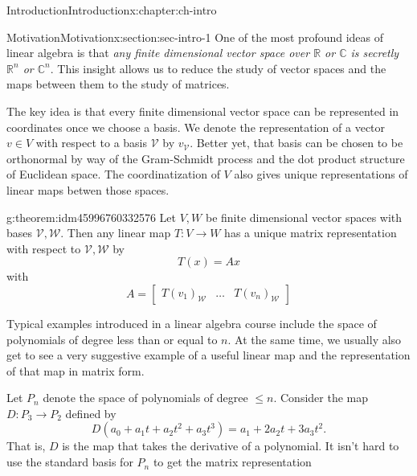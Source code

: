 \documentclass[oneside,10pt,]{book}
\numberwithin{equation}{section}
\newcommand{\C}{\mathbb{C}}
\newcommand{\R}{\mathbb{R}}
\newcommand\bbm{\begin{bmatrix}}
\newcommand\ebm{\end{bmatrix}}
\numberwithin{equation}{section}
\newcommand{\amp}{&}
\begin{document}
\begin{chapterptx}{Introduction}{}{Introduction}{}{}{x:chapter:ch-intro}
%
%
\typeout{************************************************}
\typeout{************************************************}
%
\begin{sectionptx}{Motivation}{}{Motivation}{}{}{x:section:sec-intro-1}
One of the most profound ideas of linear algebra is that \emph{any finite dimensional vector space over \(\R\) or \(\C\) is secretly \(\R^n\) or \(\C^n\)}. This insight allows us to reduce the study of vector spaces and the maps between them to the study of matrices.%
\par
The key idea is that every finite dimensional vector space can be represented in coordinates once we choose a basis. We denote the representation of a vector \(v \in V\) with respect to a basis \(\mathcal V\) by \(v_\mathcal{V}\). Better yet, that basis can be chosen to be orthonormal by way of the Gram-Schmidt process and the dot product structure of Euclidean space. The coordinatization of \(V\) also gives unique representations of linear maps betwen those spaces.%
\begin{theorem}{}{}{g:theorem:idm45996760332576}%
Let \(V, W\) be finite dimensional vector spaces with bases \(\mathcal V, \mathcal W\). Then any linear map \(T: V \to W\) has a unique matrix representation with respect to \(\mathcal V, \mathcal W\) by%
\begin{equation*}
T(x) = A x
\end{equation*}
with%
\begin{equation*}
A = \bbm T(v_1)_{\mathcal W} \amp \ldots \amp T(v_n)_{\mathcal W} \ebm
\end{equation*}
%
\end{theorem}
Typical examples introduced in a linear algebra course include the space of polynomials of degree less than or equal to \(n\). At the same time, we usually also get to see a very suggestive example of a useful linear map and the representation of that map in matrix form.%
\par
Let \(P_n\) denote the space of polynomials of degree \(\leq n\). Consider the map \(D: P_3 \to P_2\) defined by%
\begin{equation*}
D(a_0 + a_1 t + a_2 t^2 + a_3 t^3) = a_1 + 2 a_2 t + 3 a_3 t^2.
\end{equation*}
That is, \(D\) is the map that takes the derivative of a polynomial. It isn't hard to use the standard basis for \(P_n\) to get the matrix representation%

\end{sectionptx}
\end{chapterptx}
\end{document}
